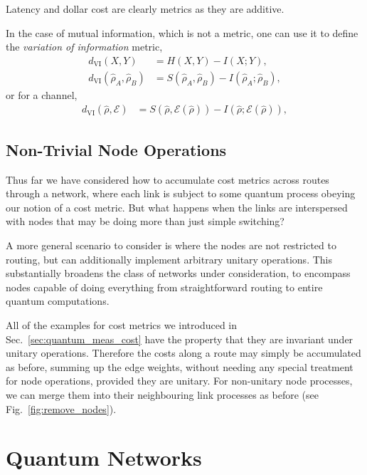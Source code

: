 \documentclass[aps,rmp,twocolumn,amsmath,amssymb,nofootinbib,superscriptaddress]{revtex4}
\begin{document}
Latency and dollar cost are clearly metrics as they are additive.

In the case of mutual information, which is not a metric, one can use it to define the \emph{variation of information} metric,
\begin{align}
d_\mathrm{VI}(X,Y) &= H(X,Y) - I(X;Y), \nonumber \\
d_\mathrm{VI}(\hat\rho_A,\hat\rho_B) &= S(\hat\rho_A,\hat\rho_B) - I(\hat\rho_A;\hat\rho_B),
\end{align}
or for a channel,
\begin{align}
d_\mathrm{VI}(\hat\rho,\mathcal{E}) &= S(\hat\rho,\mathcal{E}(\hat\rho)) - I(\hat\rho;\mathcal{E}(\hat\rho)),
\end{align}

%
%

\subsection{Non-Trivial Node Operations}

Thus far we have considered how to accumulate cost metrics across routes through a network, where each link is subject to some quantum process obeying our notion of a cost metric. But what happens when the links are interspersed with nodes that may be doing more than just simple switching?

A more general scenario to consider is where the nodes are not restricted to routing, but can additionally implement arbitrary unitary operations. This substantially broadens the class of networks under consideration, to encompass nodes capable of doing everything from straightforward routing to entire quantum computations.

All of the examples for cost metrics we introduced in Sec.~\ref{sec:quantum_meas_cost} have the property that they are invariant under unitary operations. Therefore the costs along a route may simply be accumulated as before, summing up the edge weights, without needing any special treatment for node operations, provided they are unitary. For non-unitary node processes, we can merge them into their neighbouring link processes as before (see Fig.~\ref{fig:remove_nodes}).

%
%

\section{Quantum Networks} \label{sec:quant_net}
\end{document}

